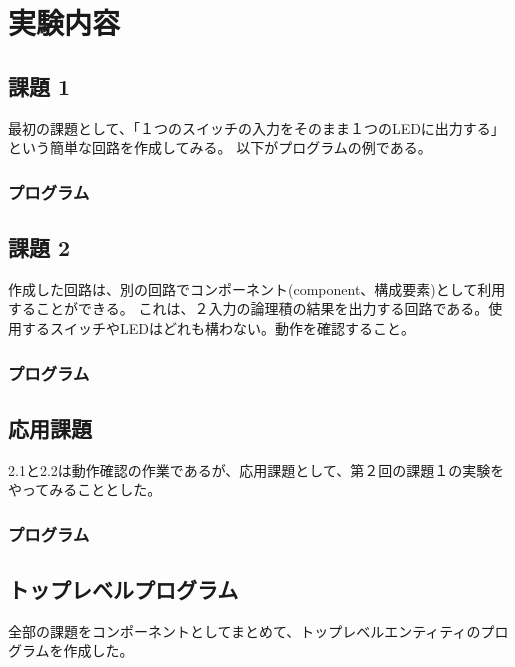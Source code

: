 \documentclass[12pt,a4paper]{ltjsarticle}
\begin{document}
\section{実験内容}\label{sec:contents}

\subsection{課題 1}\label{subsec:task-1}
最初の課題として、「１つのスイッチの入力をそのまま１つのLEDに出力する」という簡単な回路を作成してみる。
以下がプログラムの例である。

\subsubsection{プログラム}\label{subsubsec:program-1}


\newpage
\subsection{課題 2}\label{subsubsec:task-2}
作成した回路は、別の回路でコンポーネント(component、構成要素)として利用することができる。
これは、２入力の論理積の結果を出力する回路である。使用するスイッチやLEDはどれも構わない。動作を確認すること。

\subsubsection{プログラム}\label{subsubsec:program-2}





\subsection{応用課題}
2.1と2.2は動作確認の作業であるが、応用課題として、第２回の課題１の実験をやってみることとした。

\subsubsection{プログラム}\label{subsubsec:program-3}



\subsection{トップレベルプログラム}\label{subsec:top-level}
全部の課題をコンポーネントとしてまとめて、トップレベルエンティティのプログラムを作成した。
\end{document}
